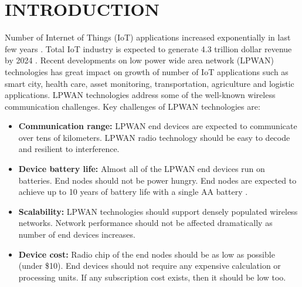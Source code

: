 \chapter{INTRODUCTION}\label{ch:introduction}

Number of Internet of Things (IoT) applications increased exponentially in last few years \cite{7721743}. Total IoT industry is expected to generate 4.3 trillion dollar revenue by 2024 \cite{7123563}. Recent developments on low power wide area network (LPWAN) technologies has great impact on growth of number of IoT applications such as smart city, health care, asset monitoring, transportation, agriculture and logistic applications. LPWAN technologies address some of the well-known wireless communication challenges. Key challenges of LPWAN technologies are:

\begin{itemize}
  \item \textbf{Communication range:} LPWAN end devices are expected to communicate over tens of kilometers. LPWAN radio technology should be easy to decode and resilient to interference.
  \item \textbf{Device battery life:} Almost all of the LPWAN end devices run on batteries. End nodes should not be power hungry. End nodes are expected to achieve up to 10 years of battery life with a single AA battery \cite{7815384}.
  \item \textbf{Scalability:} LPWAN technologies should support densely populated wireless networks. Network performance should not be affected dramatically as number of end devices increases.
  \item \textbf{Device cost:} Radio chip of the end nodes should be as low as possible (under \$10). End devices should not require any expensive calculation or processing units. If any subscription cost exists, then it should be low too.
\end{itemize}

